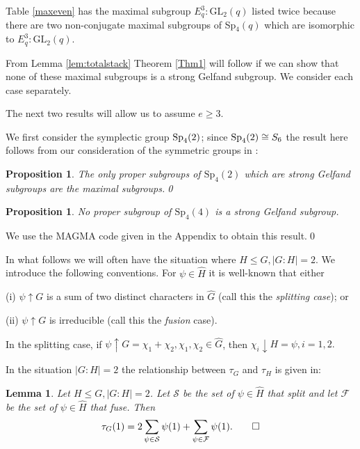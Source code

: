 \documentclass{amsart}
\newtheorem{lem}[thm]{Lemma}
\newtheorem{prop}[thm]{Proposition}
\begin{document}
Table \ref{maxeven} has the maximal  subgroup $E_q^3 \colon \mathrm{GL}_2(q)$ listed twice because there are two  non-conjugate maximal subgroups of Sp$_4(q)$ which are isomorphic to $E_q^3 \colon \mathrm{GL}_2(q)$. 


From Lemma \ref {lem:totalstack} Theorem \ref {Thm1} will follow if we can show that none of these maximal subgroups is a strong Gelfand subgroup. We consider each case separately.

The next two results  will allow us to assume   $e\ge 3$.   

We first  consider  the symplectic group ${\rm Sp}_4(2)$; since ${\rm Sp}_4(2)\cong S_6$ the result here follows from our consideration of the symmetric groups in 
\cite {AHN}:

\begin{prop} \label{thm:sp2}
The only proper subgroups of $\mathrm{Sp}_4(2)$ which are strong Gelfand subgroups are  the maximal subgroups.\qed
\end{prop}





\begin{prop}\label{cor:sp4}
No proper subgroup of $\mathrm{Sp}_4(4)$ is a strong Gelfand subgroup.
\end{prop}
 We use the MAGMA \cite {Mag} code given in the Appendix  to obtain  this result.\qed\medskip
 
 In what follows we will often have the situation where $H \le G, |G:H|=2$. We introduce the following conventions.
 For $\psi \in \hat H$ it  is well-known \cite {JaL} that either 
 
 \noindent (i) $\psi \uparrow G$ is a sum of two distinct characters  in $\hat G$  (call this the {\it splitting case}); or
 
 \noindent (ii)  $\psi \uparrow G$ is irreducible (call this the {\it fusion} case). 
 
 In the splitting case, if 
  $\psi \uparrow G=\chi_1+\chi_2, \chi_1,\chi_2 \in \hat G$, then $\chi_i\downarrow H=\psi, i=1,2.$
 
\medskip

In the situation $|G:H|=2$ the relationship between $\tau_G$ and $\tau_H$ is given in: 
\begin{lem}\label{lemsplitf}
Let $H\le G, |G:H|=2$. Let $\mathcal S$ be the set of $\psi \in\hat H$ that split and 
let  $\mathcal F$ be the set of $\psi \in\hat H$ that fuse. Then 
$$
\tau_G(1)=2\sum_{\psi \in \mathcal S}\psi(1)+  \sum_{\psi \in \mathcal F}\psi(1).\qed 
$$
\end{lem}
\end{document}
